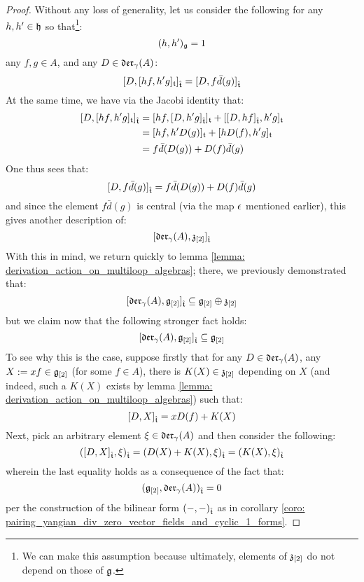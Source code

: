             \begin{proof}
                Without any loss of generality, let us consider the following for any $h, h' \in \mathfrak{h}$ so that\footnote{We can make this assumption because ultimately, elements of $\mathfrak{z}_{[2]}$ do not depend on those of $\mathfrak{g}$.}:
                    $$(h, h')_{\mathfrak{g}} = 1$$
                any $f, g \in A$, and any $D \in \mathfrak{der}_{\gamma}(A)$:
                    $$[ D, [h f, h' g]_{\mathfrak{t}} ]_{\hat{\mathfrak{t}}} = [ D, f \bar{d}( g ) ]_{\hat{\mathfrak{t}}}$$
                At the same time, we have via the Jacobi identity that:
                    $$
                        \begin{aligned}
                            [ D, [h f, h' g]_{\toroidal} ]_{\extendedtoroidal} & = [ h f, [D, h' g]_{\extendedtoroidal} ]_{\toroidal} + [ [D, h f]_{\extendedtoroidal}, h' g ]_{\toroidal}
                            \\
                            & = [ h f, h' D( g ) ]_{\toroidal} + [ h D( f ), h' g ]_{\toroidal}
                            \\
                            & = f \bar{d}( D( g ) ) + D( f ) \bar{d}(g)
                        \end{aligned}
                    $$
                One thus sees that:
                    $$[ D, f \bar{d}( g ) ]_{\hat{\mathfrak{t}}} = f \bar{d}( D( g ) ) + D( f ) \bar{d}(g)$$
                and since the element $f \bar{d}( g )$ is central (via the map $\epsilon$ mentioned earlier), this gives another description of:
                    $$[ \mathfrak{der}_{\gamma}(A), \mathfrak{z}_{[2]} ]_{\hat{\mathfrak{t}}}$$
                With this in mind, we return quickly to lemma \ref{lemma: derivation_action_on_multiloop_algebras}; there, we previously demonstrated that:
                    $$[ \mathfrak{der}_{\gamma}(A), \mathfrak{g}_{[2]} ]_{\hat{\mathfrak{t}}} \subseteq \mathfrak{g}_{[2]} \oplus \mathfrak{z}_{[2]}$$
                but we claim now that the following stronger fact holds:
                    $$[ \mathfrak{der}_{\gamma}(A), \mathfrak{g}_{[2]} ]_{\hat{\mathfrak{t}}} \subseteq \mathfrak{g}_{[2]}$$
                To see why this is the case, suppose firstly that for any $D \in \mathfrak{der}_{\gamma}(A)$, any $X := x f \in \mathfrak{g}_{[2]}$ (for some $f \in A$), there is $K(X) \in \mathfrak{z}_{[2]}$ depending on $X$ (and indeed, such a $K(X)$ exists by lemma \ref{lemma: derivation_action_on_multiloop_algebras}) such that:
                    $$[ D, X ]_{\hat{\mathfrak{t}}} = x D( f ) + K(X)$$
                Next, pick an arbitrary element $\xi \in \mathfrak{der}_{\gamma}(A)$ and then consider the following:
                    $$( [ D, X ]_{\hat{\mathfrak{t}}}, \xi )_{\hat{\mathfrak{t}}} = (D(X) + K(X), \xi)_{\hat{\mathfrak{t}}} = (K(X), \xi)_{\hat{\mathfrak{t}}}$$
                wherein the last equality holds as a consequence of the fact that:
                    $$( \mathfrak{g}_{[2]}, \mathfrak{der}_{\gamma}(A) )_{\hat{\mathfrak{t}}} = 0$$
                per the construction of the bilinear form $(-, -)_{\hat{\mathfrak{t}}}$ as in corollary \ref{coro: pairing_yangian_div_zero_vector_fields_and_cyclic_1_forms}.
            \end{proof}
